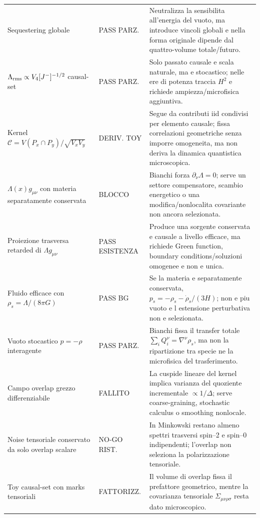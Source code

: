 \documentclass[11pt,a4paper]{article}
\newcommand{\status}[1]{\textsf{#1}}
\begin{document}
\begin{longtable}{p{}p{}p{}}
\addlinespace
Sequestering globale & \status{PASS PARZ.} & Neutralizza la sensibilita all'energia del vuoto, ma introduce vincoli globali e nella forma originale dipende dal quattro-volume totale/futuro. \\
\addlinespace
$\Lambda_{\rm rms}\propto V_4[J^-]^{-1/2}$ causal-set & \status{PASS PARZ.} & Solo passato causale e scala naturale, ma e stocastico; nelle ere di potenza traccia $H^2$ e richiede ampiezza/microfisica aggiuntiva. \\
\addlinespace
Kernel $\mathcal C=V(P_x\cap P_y)/\sqrt{V_xV_y}$ & \status{DERIV. TOY} & Segue da contributi iid condivisi per elemento causale; fissa correlazioni geometriche senza imporre omogeneita, ma non deriva la dinamica quantistica microscopica. \\
\addlinespace
$\Lambda(x)g_{\mu\nu}$ con materia separatamente conservata & \status{BLOCCO} & Bianchi forza $\partial_\nu\Lambda=0$; serve un settore compensatore, scambio energetico o una modifica/nonlocalita covariante non ancora selezionata. \\
\addlinespace
Proiezione trasversa retarded di $\Lambda g_{\mu\nu}$ & \status{PASS ESISTENZA} & Produce una sorgente conservata e causale a livello efficace, ma richiede Green function, boundary conditions/soluzioni omogenee e non e unica. \\
\addlinespace
Fluido efficace con $\rho_s=\Lambda/(8\pi G)$ & \status{PASS BG} & Se la materia e separatamente conservata, $p_s=-\rho_s-\dot\rho_s/(3H)$; non e piu vuoto e l estensione perturbativa non e selezionata. \\
\addlinespace
Vuoto stocastico $p=-\rho$ interagente & \status{PASS PARZ.} & Bianchi fissa il transfer totale $\sum_iQ_i^\nu=\nabla^\nu\rho_s$, ma non la ripartizione tra specie ne la microfisica del trasferimento. \\
\addlinespace
Campo overlap grezzo differenziabile & \status{FALLITO} & La cuspide lineare del kernel implica varianza del quoziente incrementale $\propto1/\Delta$; serve coarse-graining, stochastic calculus o smoothing nonlocale. \\
\addlinespace
Noise tensoriale conservato da solo overlap scalare & \status{NO-GO RIST.} & In Minkowski restano almeno spettri trasversi spin--2 e spin--0 indipendenti; l'overlap non seleziona la polarizzazione tensoriale. \\
\addlinespace
Toy causal-set con marks tensoriali & \status{FATTORIZZ.} & Il volume di overlap fissa il prefattore geometrico, mentre la covarianza tensoriale $\Sigma_{\mu\nu\rho\sigma}$ resta dato microscopico. \\

\end{longtable}
\end{document}
